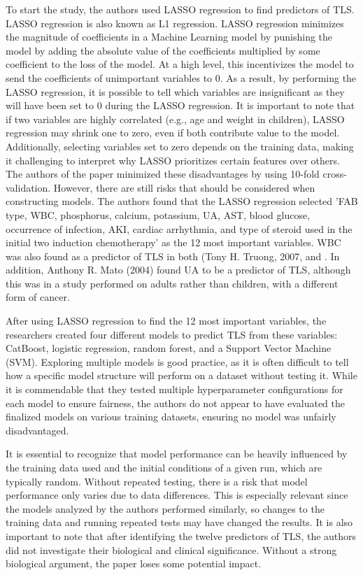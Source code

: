\documentclass{article}
\begin{document}
To start the study, the authors used LASSO regression to find predictors of TLS. LASSO regression is also known as L1 regression. LASSO regression minimizes the magnitude of coefficients in a Machine Learning model by punishing the model by adding the absolute value of the coefficients multiplied by some coefficient to the loss of the model. At a high level, this incentivizes the model to send the coefficients of unimportant variables to 0. As a result, by performing the LASSO regression, it is possible to tell which variables are insignificant as they will have been set to 0 during the LASSO regression. It is important to note that if two variables are highly correlated (e.g., age and weight in children), LASSO regression may shrink one to zero, even if both contribute value to the model.
Additionally, selecting variables set to zero depends on the training data, making it challenging to interpret why LASSO prioritizes certain features over others. The authors of the paper minimized these disadvantages by using 10-fold cross-validation. However, there are still risks that should be considered when constructing models. The authors found that the LASSO regression selected 'FAB type, WBC, phosphorus, calcium, potassium, UA, AST, blood glucose, occurrence of infection, AKI, cardiac arrhythmia, and type of steroid used in the initial two induction chemotherapy' as the 12 most important variables. WBC was also found as a predictor of TLS in both (Tony H. Truong, 2007, \cite{truong2007features} and \cite{mato2004predictive}. In addition, Anthony R. Mato (2004) found UA to be a predictor of TLS, although this was in a study performed on adults rather than children, with a different form of cancer.

After using LASSO regression to find the 12 most important variables, the researchers created four different models to predict TLS from these variables: CatBoost, logistic regression, random forest, and a Support Vector Machine (SVM). Exploring multiple models is good practice, as it is often difficult to tell how a specific model structure will perform on a dataset without testing it. While it is commendable that they tested multiple hyperparameter configurations for each model to ensure fairness, the authors do not appear to have evaluated the finalized models on various training datasets, ensuring no model was unfairly disadvantaged. 

 It is essential to recognize that model performance can be heavily influenced by the training data used and the initial conditions of a given run, which are typically random. Without repeated testing, there is a risk that model performance only varies due to data differences. This is especially relevant since the models analyzed by the authors performed similarly, so changes to the training data and running repeated tests may have changed the results.
It is also important to note that after identifying the twelve predictors of TLS, the authors did not investigate their biological and clinical significance. Without a strong biological argument, the paper loses some potential impact.
\end{document}
